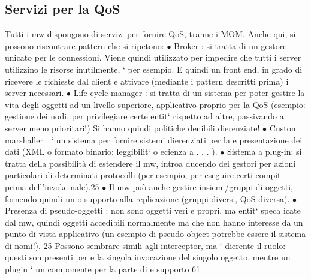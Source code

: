 \documentclass[a4paper,12pt]{article}
\begin{document}
\subsection{Servizi per la QoS}
Tutti i mw dispongono di servizi per fornire QoS, tranne i MOM. Anche qui, si
possono riscontrare pattern che si ripetono:
$\bullet$ Broker : si tratta di un gestore unicato per le connessioni. Viene quindi
utilizzato per impedire che tutti i server utilizzino le risorse inutilmente,
`
per esempio. E quindi un front end, in grado di ricevere le richieste dal
client e attivare (mediante i pattern descritti prima) i server necessari.
$\bullet$ Life cycle manager : si tratta di un sistema per poter gestire la vita degli
oggetti ad un livello superiore, applicativo proprio per la QoS (esempio:
gestione dei nodi, per privilegiare certe entit` rispetto ad altre, passivando
a
server meno prioritari!) Si hanno quindi politiche denibili dierenziate!
$\bullet$ Custom marshaller : ` un sistema per fornire sistemi dierenziati per la
e
presentazione dei dati (XML o formato binario: leggibilit` o ecienza
a
. . . ).
$\bullet$ Sistema a plug-in: si tratta della possibilità di estendere il mw, introa
ducendo dei gestori per azioni particolari di determinati protocolli (per
esempio, per eseguire certi compiti prima dell'invoke nale).25
$\bullet$ Il mw può anche gestire insiemi/gruppi di oggetti, fornendo quindi un
o
supporto alla replicazione (gruppi diversi, QoS diversa).
$\bullet$ Presenza di pseudo-oggetti : non sono oggetti veri e propri, ma entit` speca
icate dal mw, quindi oggetti accedibili normalmente ma che non hanno
interesse da un punto di vista applicativo (un esempio di pseudo-object
potrebbe essere il sistema di nomi!).
25 Possono sembrare simili agli interceptor, ma ` dierente il ruolo: questi son presenti per
e
la singola invocazione del singolo oggetto, mentre un plugin ` un componente per la parte di
e
supporto
61
\end{document}
